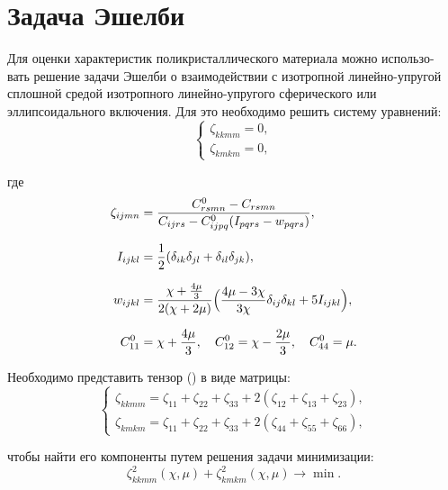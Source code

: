 \documentclass[12pt,a4paper]{article}
\begin{document}
 \pagebreak

 \section{Задача Эшелби}

 Для оценки характеристик поликристаллического материала можно использо-
вать решение задачи Эшелби о взаимодействии с изотропной линейно-упругой сплошной средой изотропного линейно-упругого сферического или эллипсоидального включения. Для это необходимо решить систему уравнений:
\begin{equation}
    \begin{cases}
        \zeta_{kkmm} = 0, \\
        \zeta_{kmkm} = 0,
    \end{cases}  
    \label{eq:zeta}
\end{equation}

\noindent где 
\begin{gather*}
    \begin{split}
        \zeta_{ijmn} &= \dfrac{C_{rsmn}^0 - C_{rsmn}}{C_{ijrs} - C_{ijpq}^0 (I_{pqrs} - w_{pqrs})}, \\[0.7em]
        I_{ijkl} &= \dfrac{1}{2}(\delta_{ik} \delta_{jl} + \delta_{il} \delta_{jk}), \\[0.7em]
        w_{ijkl} &= \dfrac{\chi + \frac{4 \mu}{3}}{2(\chi + 2\mu)} \Bigl(\dfrac{4 \mu - 3\chi}{3 \chi} \delta_{ij} \delta_{kl} + 5 I_{ijkl} \Bigr), \\[0.7em]
        C^0_{11} &= \chi + \dfrac{4 \mu}{3}, \quad C^0_{12} = \chi - \dfrac{2\mu}{3}, \quad C^0_{44} = \mu.
    \end{split}
\end{gather*}

Необходимо представить тензор () в виде матрицы:
\[
    \begin{cases}
        \zeta_{kkmm} = \zeta_{11} + \zeta_{22} + \zeta_{33} + 2(\zeta_{12} + \zeta_{13} + \zeta_{23}), \\
        \zeta_{kmkm} = \zeta_{11} + \zeta_{22} + \zeta_{33} + 2(\zeta_{44} + \zeta_{55} + \zeta_{66}),
    \end{cases}  
\]

\noindent чтобы найти его компоненты путем решения задачи минимизации:
\begin{equation}
    \zeta^2_{kkmm}(\chi, \mu) + \zeta^2_{kmkm}(\chi, \mu) \rightarrow \min.
    \label{eq:min}    
\end{equation}
\end{document}
